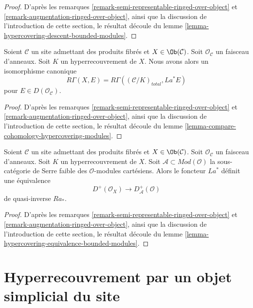 \begin{proof}
D'après les remarques \ref{remark-semi-representable-ringed-over-object} et
\ref{remark-augmentation-ringed-over-object}, ainsi que la discussion de
l'introduction de cette section,
le résultat découle du lemme \ref{lemma-hypercovering-descent-bounded-modules}.
\end{proof}

\begin{lemma}
\label{lemma-compare-cohomology-hypercovering-X-modules}
Soient $\mathcal{C}$ un site admettant des produits fibrés et $X \in \Ob(\mathcal{C})$.
Soit $\mathcal{O}_\mathcal{C}$ un faisceau d'anneaux.
Soit $K$ un hyperrecouvrement de $X$.
Nous avons alors un isomorphisme canonique
$$
R\Gamma(X, E) = R\Gamma((\mathcal{C}/K)_{total}, La^*E)
$$
pour $E \in D(\mathcal{O}_\mathcal{C})$.
\end{lemma}

\begin{proof}
D'après les remarques \ref{remark-semi-representable-ringed-over-object} et
\ref{remark-augmentation-ringed-over-object}, ainsi que la discussion de
l'introduction de cette section,
le résultat découle du lemme \ref{lemma-compare-cohomology-hypercovering-modules}.
\end{proof}

\begin{lemma}
\label{lemma-hypercovering-X-equivalence-bounded-modules}
Soient $\mathcal{C}$ un site admettant des produits fibrés et $X \in \Ob(\mathcal{C})$.
Soit $\mathcal{O}_\mathcal{C}$ un faisceau d'anneaux.
Soit $K$ un hyperrecouvrement de $X$.
Soit $\mathcal{A} \subset \textit{Mod}(\mathcal{O})$
la sous-catégorie de Serre faible des $\mathcal{O}$-modules cartésiens.
Alors le foncteur $La^*$ définit une équivalence
$$
D^+(\mathcal{O}_X) \longrightarrow D_\mathcal{A}^+(\mathcal{O})
$$
de quasi-inverse $Ra_*$.
\end{lemma}

\begin{proof}
D'après les remarques \ref{remark-semi-representable-ringed-over-object} et
\ref{remark-augmentation-ringed-over-object}, ainsi que la discussion de
l'introduction de cette section,
le résultat découle du lemme \ref{lemma-hypercovering-equivalence-bounded-modules}.
\end{proof}










\section{Hyperrecouvrement par un objet simplicial du site}
\label{section-hypercovering}

